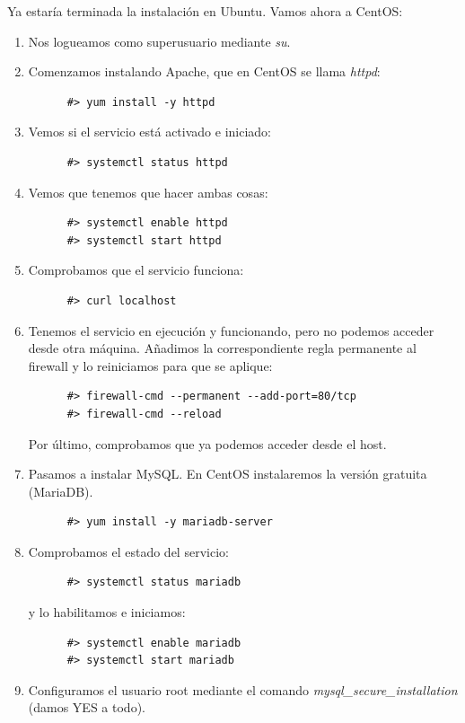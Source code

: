 \documentclass[12pt,spanish]{article}
\begin{document}
  Ya estaría terminada la instalación en Ubuntu. Vamos ahora a CentOS:
  \begin{enumerate}
    \item Nos logueamos como superusuario mediante \textit{su}.
    \item Comenzamos instalando Apache, que en CentOS se llama \textit{httpd}:
    \begin{lstlisting}
      #> yum install -y httpd
    \end{lstlisting}
    \item Vemos si el servicio está activado e iniciado:
    \begin{lstlisting}
      #> systemctl status httpd
    \end{lstlisting}
    \item Vemos que tenemos que hacer ambas cosas:
    \begin{lstlisting}
      #> systemctl enable httpd
      #> systemctl start httpd
    \end{lstlisting}
    \item Comprobamos que el servicio funciona:
    \begin{lstlisting}
      #> curl localhost
    \end{lstlisting}
    \item Tenemos el servicio en ejecución y funcionando, pero no podemos acceder desde otra máquina. Añadimos la correspondiente regla permanente al firewall y lo reiniciamos para que se aplique:
    \begin{lstlisting}
      #> firewall-cmd --permanent --add-port=80/tcp
      #> firewall-cmd --reload
    \end{lstlisting}
    Por último, comprobamos que ya podemos acceder desde el host.
    \item Pasamos a instalar MySQL. En CentOS instalaremos la versión gratuita (MariaDB).
    \begin{lstlisting}
      #> yum install -y mariadb-server
    \end{lstlisting}
    \item Comprobamos el estado del servicio:
    \begin{lstlisting}
      #> systemctl status mariadb
    \end{lstlisting}
    y lo habilitamos e iniciamos:
    \begin{lstlisting}
      #> systemctl enable mariadb
      #> systemctl start mariadb
    \end{lstlisting}
    \item Configuramos el usuario root mediante el comando \textit{mysql\_secure\_installation} (damos YES a todo).

\end{enumerate}
\end{document}

